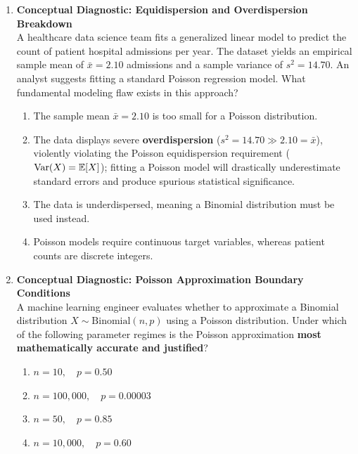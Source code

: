 \begin{enumerate}[resume]
\item \textbf{Conceptual Diagnostic: Equidispersion and Overdispersion Breakdown} \\
A healthcare data science team fits a generalized linear model to predict the count of patient hospital admissions per year. The dataset yields an empirical sample mean of $\bar{x} = 2.10$ admissions and a sample variance of $s^2 = 14.70$. An analyst suggests fitting a standard Poisson regression model. What fundamental modeling flaw exists in this approach?
\begin{enumerate}
    \item The sample mean $\bar{x} = 2.10$ is too small for a Poisson distribution.
    \item The data displays severe \textbf{overdispersion} ($s^2 = 14.70 \gg 2.10 = \bar{x}$), violently violating the Poisson equidispersion requirement ($\operatorname{Var}(X) = \mathbb{E}[X]$); fitting a Poisson model will drastically underestimate standard errors and produce spurious statistical significance.
    \item The data is underdispersed, meaning a Binomial distribution must be used instead.
    \item Poisson models require continuous target variables, whereas patient counts are discrete integers.
\end{enumerate}

\item \textbf{Conceptual Diagnostic: Poisson Approximation Boundary Conditions} \\
A machine learning engineer evaluates whether to approximate a Binomial distribution $X \sim \text{Binomial}(n, p)$ using a Poisson distribution. Under which of the following parameter regimes is the Poisson approximation \textbf{most mathematically accurate and justified}?
\begin{enumerate}
    \item $n = 10, \quad p = 0.50$
    \item $n = 100{,}000, \quad p = 0.00003$
    \item $n = 50, \quad p = 0.85$
    \item $n = 10{,}000, \quad p = 0.60$
\end{enumerate}
\end{enumerate}
